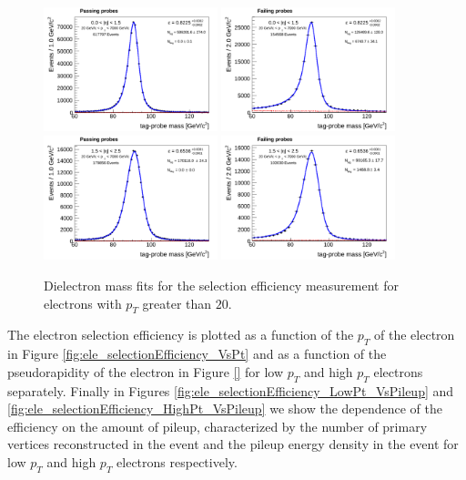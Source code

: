 \begin{figure}[!htbp]
\begin{center}
\includegraphics[width=0.45\textwidth]{figures/ElectronSelectionEffMassFitPass_EtaPtBin4.pdf}
\includegraphics[width=0.45\textwidth]{figures/ElectronSelectionEffMassFitFail_EtaPtBin4.pdf}
\includegraphics[width=0.45\textwidth]{figures/ElectronSelectionEffMassFitPass_EtaPtBin5.pdf}
\includegraphics[width=0.45\textwidth]{figures/ElectronSelectionEffMassFitFail_EtaPtBin5.pdf}
\caption{Dielectron mass fits for the selection efficiency measurement for electrons with
$p_{T}$ greater than $20$\GeV.}
\label{fig:ele_selectionEfficiency_massfits_highPt}
\end{center}
\end{figure}


The electron selection efficiency is plotted as a function of the $p_{T}$ of the electron in Figure 
\ref{fig:ele_selectionEfficiency_VsPt} and as a function of the pseudorapidity of the electron
in Figure \ref{} for low $p_{T}$ and high $p_{T}$ electrons separately. Finally in Figures
\ref{fig:ele_selectionEfficiency_LowPt_VsPileup} and \ref{fig:ele_selectionEfficiency_HighPt_VsPileup}
we show the dependence of the efficiency on the amount of pileup, characterized by the
number of primary vertices reconstructed in the event and the pileup energy density 
in the event for low $p_{T}$ and high $p_{T}$ electrons respectively.

